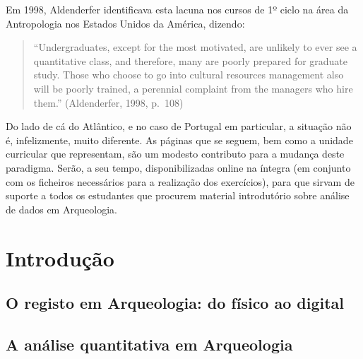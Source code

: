 \documentclass[
  letterpaper,
  DIV=11,
  numbers=noendperiod]{scrreprt}
\begin{document}
Em 1998, Aldenderfer identificava esta lacuna nos cursos de 1º ciclo na
área da Antropologia nos Estados Unidos da América, dizendo:

\begin{quote}
``Undergraduates, except for the most motivated, are unlikely to ever
see a quantitative class, and therefore, many are poorly prepared for
graduate study. Those who choose to go into cultural resources
management also will be poorly trained, a perennial complaint from the
managers who hire them.'' (Aldenderfer, 1998, p.~108)
\end{quote}

Do lado de cá do Atlântico, e no caso de Portugal em particular, a
situação não é, infelizmente, muito diferente. As páginas que se seguem,
bem como a unidade curricular que representam, são um modesto contributo
para a mudança deste paradigma. Serão, a seu tempo, disponibilizadas
online na íntegra (em conjunto com os ficheiros necessários para a
realização dos exercícios), para que sirvam de suporte a todos os
estudantes que procurem material introdutório sobre análise de dados em
Arqueologia.


\chapter*{\texorpdfstring{\textbf{Introdução}}{Introdução}}\label{introduuxe7uxe3o}


\section*{\texorpdfstring{\textbf{O registo em Arqueologia: do físico ao
digital}}{O registo em Arqueologia: do físico ao digital}}\label{o-registo-em-arqueologia-do-fuxedsico-ao-digital}


\section*{\texorpdfstring{\textbf{A análise quantitativa em
Arqueologia}}{A análise quantitativa em Arqueologia}}\label{a-anuxe1lise-quantitativa-em-arqueologia}
\end{document}
